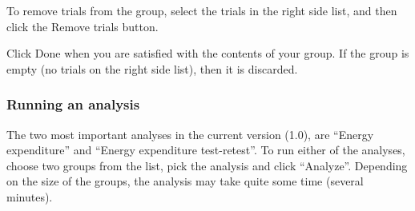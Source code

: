 \documentclass[a4paper,11pt]{article}
\begin{document}
To remove trials from the group, select the trials in the right side
list, and then click the Remove trials button.

Click Done when you are satisfied with the contents of your group. If
the group is empty (no trials on the right side list), then it is
discarded.  

\subsubsection{Running an analysis}
The two most important analyses in the current version (1.0), are
``Energy expenditure'' and ``Energy expenditure test-retest''. To run
either of the analyses, choose two groups from the list, pick the
analysis and click ``Analyze''. Depending on the size of the groups,
the analysis may take quite some time (several minutes). 
\end{document}
